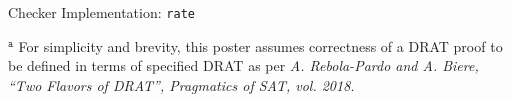 \documentclass[final,hyperref={pdfpagelabels=true}]{beamer}
\begin{document}
\begin{frame}[fragile]
\begin{columns}[t]
\begin{column}{.45\textwidth}
\begin{block}{Checker Implementation: \texttt{rate}}
    \begin{singlespace}
        \footnotesize
        $^\texttt{a}$ For simplicity and brevity, this poster assumes
        correctness of a DRAT proof to be defined in terms of specified DRAT
        as per \emph{A. Rebola-Pardo and A. Biere, ``Two Flavors of DRAT'',
        Pragmatics of SAT, vol. 2018.}
    \end{singlespace}

    \end{block}
    \end{column}
  \end{columns}
\end{frame}
\end{document}

